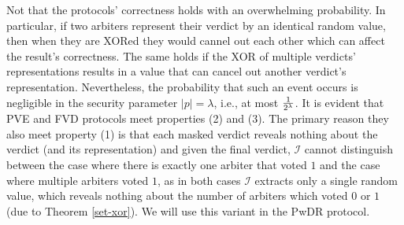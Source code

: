  
 Not that the protocols' correctness holds with an overwhelming probability. In particular, if two arbiters  represent their verdict by an identical random value, then when they are XORed they would cannel out each other which can affect the result's correctness. The same holds if the XOR of  multiple verdicts' representations results in a value that can cancel out another verdict's representation. Nevertheless, the probability that such an event occurs is negligible in the security parameter $|p|=\lambda$, i.e., at most   $\frac{1}{2^{\scriptscriptstyle \lambda}}$. It is evident that PVE and FVD protocols meet properties (2) and (3). The primary reason they also meet  property (1) is that each masked verdict reveals nothing about the verdict (and its representation) and  given the final verdict, $\mathcal{I}$ cannot distinguish between the case where there is exactly one arbiter that voted  $1$ and the case where multiple arbiters voted $1$, as in both cases $\mathcal{I}$   extracts only a single random value, which reveals nothing about the number of arbiters which voted $0$ or $1$ (due to Theorem \ref{set-xor}). We will use this variant in the PwDR protocol. 




